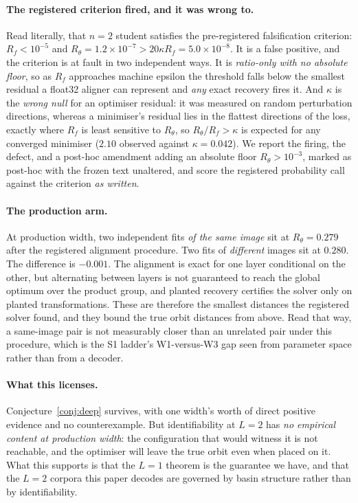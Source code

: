 \paragraph{The registered criterion fired, and it was wrong to.} Read literally, that $n=2$ student
satisfies the pre-registered falsification criterion: $R_f < 10^{-5}$ and
$R_\theta = 1.2\times10^{-7} > 20\kappa R_f = 5.0\times10^{-8}$. It is a false positive, and the
criterion is at fault in two independent ways. It is \emph{ratio-only with no absolute floor}, so
as $R_f$ approaches machine epsilon the threshold falls below the smallest residual a float32
aligner can represent and \emph{any} exact recovery fires it. And $\kappa$ is the \emph{wrong null}
for an optimiser residual: it was measured on random perturbation directions, whereas a minimiser's
residual lies in the flattest directions of the loss, exactly where $R_f$ is least sensitive to $R_\theta$, so $R_\theta/R_f > \kappa$ is expected for any converged minimiser ($2.10$ observed
against $\kappa = 0.042$). We report the firing, the defect, and a post-hoc amendment adding an
absolute floor $R_\theta > 10^{-3}$, marked as post-hoc with the frozen text unaltered, and score
the registered probability call against the criterion \emph{as written}.

\paragraph{The production arm.} At production width, two independent fits \emph{of the same image}
sit at $R_\theta = 0.279$ after the registered alignment procedure. Two fits of \emph{different}
images sit at $0.280$. The difference is $-0.001$. The alignment is exact for one layer conditional
on the other, but alternating between layers is not guaranteed to reach the global optimum over the
product group, and planted recovery certifies the solver only on planted transformations. These are
therefore the smallest distances the registered solver found, and they bound the true orbit
distances from above. Read that way, a same-image pair is not measurably closer than an unrelated
pair under this procedure, which is the S1 ladder's W1-versus-W3 gap seen from parameter space
rather than from a decoder.

\paragraph{What this licenses.} Conjecture~\ref{conj:deep} survives, with one width's worth of
direct positive evidence and no counterexample. But identifiability at $L=2$ has \emph{no empirical
content at production width}: the configuration that would witness it is not reachable, and the
optimiser will leave the true orbit even when placed on it. What this supports is that the $L=1$ theorem is the guarantee we have, and that the $L=2$ corpora
this paper decodes are governed by basin structure rather than by identifiability.

